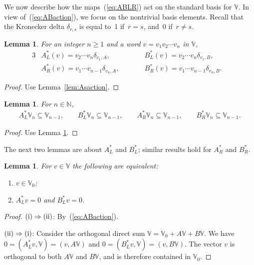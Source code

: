\documentclass[pdftex]{sigma}
\numberwithin{equation}{section}
\newtheorem{Lemma}[Theorem]{Lemma}
\begin{document}
We now describe how the maps~(\ref{eq:ABLR})
act on the standard basis for $\mathbb V$.
In view of~(\ref{eq:ABaction}),
we focus on the nontrivial basis elements.
Recall that the Kronecker delta $\delta_{r,s}$ is equal to~1 if~$r=s$, and~0 if~$r\not=s$.
\begin{Lemma}
\label{lem:Astar}
For an integer $n\geq 1$ and a word
$v=v_1v_2\cdots v_n$ in $\mathbb V$,
\begin{alignat*}{3}
& A^*_L(v) =v_2\cdots v_n \delta_{v_1, A},
\qquad && B^*_L(v) =v_2\cdots v_n \delta_{v_1, B},& \\
& A^*_R(v) =v_1\cdots v_{n-1} \delta_{v_n, A},\qquad &&
B^*_R(v) = v_1\cdots v_{n-1} \delta_{v_n, B}.&
\end{alignat*}
\end{Lemma}
\begin{proof} Use Lemma~\ref{lem:Asaction}.
\end{proof}
\begin{Lemma}\label{lem:ABsLower}
For $n \in \mathbb N$,
\begin{gather*}
A^*_L {\mathbb V}_n \subseteq {\mathbb V}_{n-1}, \qquad
B^*_L {\mathbb V}_n \subseteq {\mathbb V}_{n-1}, \qquad
A^*_R {\mathbb V}_n \subseteq {\mathbb V}_{n-1}, \qquad
B^*_R {\mathbb V}_n \subseteq {\mathbb V}_{n-1}.
\end{gather*}
\end{Lemma}
\begin{proof} Use Lemma
\ref{lem:Astar}.
\end{proof}

The next two lemmas are about $A^*_L$ and $B^*_L$; similar results
hold for $A^*_R$ and $B^*_R$.
\begin{Lemma}\label{lem:ABKer}
For $v \in \mathbb V$ the following are equivalent:
\begin{enumerate}\itemsep=0pt
\item[\rm (i)] $v \in {\mathbb V}_0$;
\item[\rm (ii)] $A^*_L v=0$ and $B^*_L v = 0$.
\end{enumerate}
\end{Lemma}
\begin{proof}${\rm (i)} \Rightarrow {\rm (ii)}$: By~(\ref{eq:ABaction}).

${\rm (ii)} \Rightarrow {\rm (i)}$: Consider the orthogonal
direct sum $\mathbb V= \mathbb V_0 + A\mathbb V + B \mathbb V$.
We have $0 = (A^*_Lv, \mathbb V) = (v, A\mathbb V)$ and
$0 = (B^*_Lv, \mathbb V) = (v, B\mathbb V)$.
The vector $v$ is orthogonal to both
$A\mathbb V$ and $B\mathbb V$, and is therefore contained in $\mathbb V_0$.
\end{proof}
\end{document}
